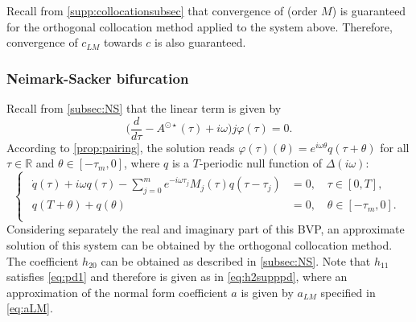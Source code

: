 \documentclass[english]{myarticle}
\begin{document}
\begin{sloppypar}
Recall from \cref{supp:collocationsubsec} that convergence of (order $M$) is guaranteed for the orthogonal collocation method applied to the system above. Therefore, convergence of $c_{LM}$ towards $c$ is also guaranteed.

\subsubsection{Neimark-Sacker bifurcation}
Recall from \cref{subsec:NS} that the linear term is given by
\begin{equation*}
    \bigg(\frac{d}{d \tau} - A^{\odot \star}(\tau) + i \omega \bigg)j\varphi(\tau) = 0.
\end{equation*}
According to \cref{prop:pairing}, the solution reads $\varphi(\tau)(\theta) = e^{i \omega \theta}q(\tau+\theta)$ for all $\tau \in \mathbb{R}$ and $\theta \in [-\tau_m,0]$, where $q$ is a $T$-periodic null function of $\Delta(i \omega)$:
\begin{equation*}
    \begin{cases}
    \begin{aligned}
    \dot{q}(\tau) + i \omega q(\tau) - \textstyle\sum_{j=0}^m e^{- i \omega \tau_j} M_j(\tau)q(\tau-\tau_j) &= 0, \quad \tau \in [0,T], \\
    q(T + \theta) + q(\theta) &= 0, \quad  \theta \in [-\tau_m,0]. \\
    \end{aligned}
    \end{cases}
\end{equation*}
Considering separately the real and imaginary part of this BVP, an approximate solution of this system can be obtained by the orthogonal collocation method. The coefficient $h_{20}$ can be obtained as described in \cref{subsec:NS}. Note that $h_{11}$ satisfies \eqref{eq:pd1} and therefore is given as in \eqref{eq:h2supppd}, where an approximation of the normal form coefficient $a$ is given by $a_{LM}$ specified in \eqref{eq:aLM}.


\end{sloppypar}
\end{document}
